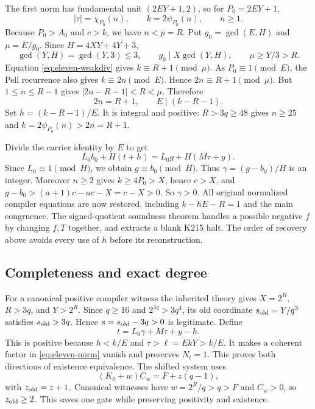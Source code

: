 The first norm has fundamental unit $(2EY+1,2)$, so for $P_0=2EY+1$,
\[
 |\tau|=\chi_{P_0}(n),\qquad k=2\psi_{P_0}(n),\qquad n\ge1.
\]
Because $P_0>A_0$ and $c>k$, we have $n<p=R$. Put
$g_0=\gcd(E,H)$ and $\mu=E/g_0$. Since $H=4XY+4Y+3$,
\begin{equation}
 \gcd(Y,H)=\gcd(Y,3)\le3,\qquad
 g_0\mid X\gcd(Y,H),\qquad \mu\ge Y/3>R.
 \label{eq:eleven-modulus}
\end{equation}
Equation \eqref{eq:eleven-weakdiv} gives $k\equiv R+1\pmod\mu$.
As $P_0\equiv1\pmod E$, the Pell recurrence also gives
$k\equiv2n\pmod E$. Hence $2n\equiv R+1\pmod\mu$. But
$1\le n\le R-1$ gives $|2n-R-1|<R<\mu$. Therefore
\[
 2n=R+1,\qquad E\mid(k-R-1).
\]
Set $h=(k-R-1)/E$. It is integral and positive: $R>3q\ge48$ gives
$n\ge25$ and $k=2\psi_{P_0}(n)>2n=R+1$.

Divide the carrier identity by $E$ to get
\[
 L_0b_0+H(t+h)=L_0g+H(M\tau+y).
\]
Since $L_0\equiv1\pmod H$, we obtain $g\equiv b_0\pmod H$.
Thus $\gamma=(g-b_0)/H$ is an integer. Moreover $n\ge2$ gives
$k\ge4P_0>X$, hence $c>X$, and
$g-b_0>(a+1)c-ac-X=c-X>0$. So $\gamma>0$.
All original normalized compiler equations are now restored, including
$k-hE-R=1$ and the main congruence. The signed-quotient soundness theorem
handles a possible negative $f$ by changing $f,T$ together, and extracts a
blank K215 halt. The order of recovery above avoids every use of $h$ before
its reconstruction.

\subsection{Completeness and exact degree}

For a canonical positive compiler witness the inherited theory gives
$X=2^R$, $R>3q$, and $Y>2^R$. Since $q\ge16$ and
$2^{3q}>3q^4$, its old coordinate $s_{\rm old}=Y/q^3$ satisfies
$s_{\rm old}>3q$. Hence $s=s_{\rm old}-3q>0$ is legitimate. Define
\[
 t=L_0\gamma+M\tau+y-h.
\]
This is positive because $h<k/E$ and $\tau>\ell=EkY>k/E$.
It makes a coherent factor in \eqref{eq:eleven-norm} vanish and preserves
$N_t=1$. This proves both directions of existence equivalence.
The shifted system uses
\[
 (K_0+w)C_w=F+z(q-1),
\]
with $z_{\rm old}=z+1$. Canonical witnesses have $w=2^R/q>q>F$ and
$C_w>0$, so $z_{\rm old}\ge2$. This saves one gate while preserving
positivity and existence.


